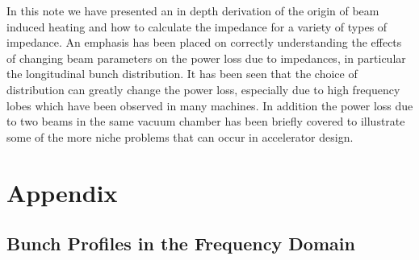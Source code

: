 \documentclass[12pt,a4paper,twopage,openright]{report}
\begin{document}
In this note we have presented an in depth derivation of the origin of beam induced heating and how to calculate the impedance for a variety of types of impedance. An emphasis has been placed on correctly understanding the effects of changing beam parameters on the power loss due to impedances, in particular the longitudinal bunch distribution. It has been seen that the choice of distribution can greatly change the power loss, especially due to high frequency lobes which have been observed in many machines. In addition the power loss due to two beams in the same vacuum chamber has been briefly covered to illustrate some of the more niche problems that can occur in accelerator design.

\section{Appendix}
\subsection{Bunch Profiles in the Frequency Domain}
\end{document}
